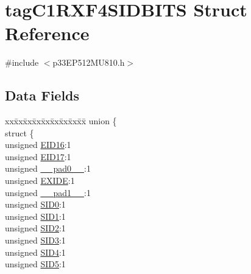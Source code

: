 \hypertarget{structtag_c1_r_x_f4_s_i_d_b_i_t_s}{}\section{tag\+C1\+R\+X\+F4\+S\+I\+D\+B\+I\+TS Struct Reference}
\label{structtag_c1_r_x_f4_s_i_d_b_i_t_s}


{\ttfamily \#include $<$p33\+E\+P512\+M\+U810.\+h$>$}

\subsection*{Data Fields}
\begin{DoxyCompactItemize}
\item 
\begin{tabbing}
xx\=xx\=xx\=xx\=xx\=xx\=xx\=xx\=xx\=\kill
union \{\\
\>struct \{\\
\>\>unsigned \hyperlink{structtag_c1_r_x_f4_s_i_d_b_i_t_s_a6dd5663b0c9838c56db040560ca0efa1}{EID16}:1\\
\>\>unsigned \hyperlink{structtag_c1_r_x_f4_s_i_d_b_i_t_s_aa648615464b0eb29967529333eee9fd9}{EID17}:1\\
\>\>unsigned \hyperlink{structtag_c1_r_x_f4_s_i_d_b_i_t_s_adf71f3d8410c1f1dbbc96680a92c49af}{\_\_pad0\_\_}:1\\
\>\>unsigned \hyperlink{structtag_c1_r_x_f4_s_i_d_b_i_t_s_a09ff1c1be3927220bd3dfbc10edfe243}{EXIDE}:1\\
\>\>unsigned \hyperlink{structtag_c1_r_x_f4_s_i_d_b_i_t_s_acaf2d0924a107ec6e8d2e31febaf66f9}{\_\_pad1\_\_}:1\\
\>\>unsigned \hyperlink{structtag_c1_r_x_f4_s_i_d_b_i_t_s_a1ca276ac15df60e1f7b9a6d0011ade93}{SID0}:1\\
\>\>unsigned \hyperlink{structtag_c1_r_x_f4_s_i_d_b_i_t_s_a3405d354f81391f879648f69f504dfc8}{SID1}:1\\
\>\>unsigned \hyperlink{structtag_c1_r_x_f4_s_i_d_b_i_t_s_ad744966dfc49307f731b7045b01b94e5}{SID2}:1\\
\>\>unsigned \hyperlink{structtag_c1_r_x_f4_s_i_d_b_i_t_s_a9345f3e64720be93e83d8dfc827f3f45}{SID3}:1\\
\>\>unsigned \hyperlink{structtag_c1_r_x_f4_s_i_d_b_i_t_s_aefb106fed4bb40e2c3c71ac612c554e3}{SID4}:1\\
\>\>unsigned \hyperlink{structtag_c1_r_x_f4_s_i_d_b_i_t_s_a0f221b3c9612231686bf87ccdcec8489}{SID5}:1\\

\end{tabbing}
\end{DoxyCompactItemize}
